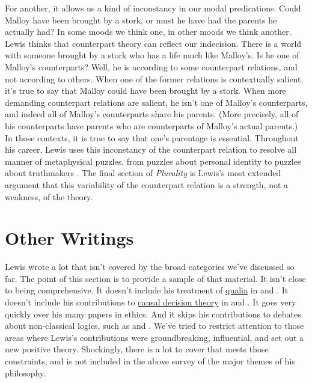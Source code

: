 For another, it allows us a kind of inconstancy in our modal predications. Could Malloy have been brought by a stork, or must he have had the parents he actually had? In some moods we think one, in other moods we think another. Lewis thinks that counterpart theory can reflect our indecision. There is a world with someone brought by a stork who has a life much like Malloy's. Is he one of Malloy's counterparts? Well, he is according to some counterpart relations, and not according to others. When one of the former relations is contextually salient, it's true to say that Malloy could have been brought by a stork. When more demanding counterpart relations are salient, he isn't one of Malloy's counterparts, and indeed all of Malloy's counterparts share his parents. (More precisely, all of his counterparts have parents who are counterparts of Malloy's actual parents.) In those contexts, it is true to say that one's parentage is essential. Throughout his career, Lewis uses this inconstancy of the counterpart relation to resolve all manner of metaphysical puzzles, from puzzles about personal identity \citeyearpar{Lewis1971c} to puzzles about truthmakers \citeyearpar{Lewis2003b}. The final section of \textit{Plurality} is Lewis's most extended argument that this variability of the counterpart relation is a strength, not a weakness, of the theory.

\section{Other Writings} 
Lewis wrote a lot that isn't covered by the broad categories we've discussed so far. The point of this section is to provide a sample of that material. It isn't close to being comprehensive. It doesn't include his treatment of \href{http://plato.stanford.edu/qualia/}{qualia} in \citeyearpar{Lewis1988h} and \citeyearpar{Lewis1995b}. It doesn't include his contributions to \href{http://plato.stanford.edu/decision-causal/}{causal decision theory} in \citeyearpar{Lewis1979e} and \citeyearpar{Lewis1981b}. It goes very quickly over his many papers in ethics. And it skips his contributions to debates about non-classical logics, such as \citeyearpar{Lewis1982c} and \citeyearpar{Lewis1990}. We've tried to restrict attention to those areas where Lewis's contributions were groundbreaking, influential, and set out a new positive theory. Shockingly, there is a lot to cover that meets those constraints, and is not included in the above survey of the major themes of his philosophy.

